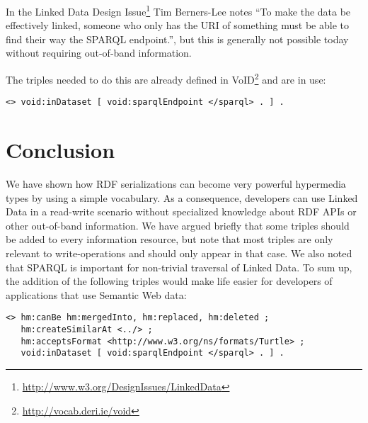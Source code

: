 \documentclass{llncs}
\begin{document}
In the Linked Data Design
Issue\footnote{\url{http://www.w3.org/DesignIssues/LinkedData}} Tim
Berners-Lee notes ``To make the data be effectively linked, someone
who only has the URI of something must be able to find their way the
SPARQL endpoint.'', but this is generally not possible today without
requiring out-of-band information.

The triples needed to do this are already defined in
VoID\footnote{\url{http://vocab.deri.ie/void}} and are in use:
\begin{verbatim}
<> void:inDataset [ void:sparqlEndpoint </sparql> . ] .
\end{verbatim}

\section{Conclusion}

We have shown how RDF serializations can become very powerful
hypermedia types by using a simple vocabulary. As a consequence,
developers can use Linked Data in a read-write scenario without
specialized knowledge about RDF APIs or other out-of-band
information. We have argued briefly that some triples should be added
to every information resource, but note that most triples are only
relevant to write-operations and should only appear in that case. We
also noted that SPARQL is important for non-trivial traversal of
Linked Data. To sum up, the addition of the following triples would
make life easier for developers of applications that use Semantic Web
data:

\begin{verbatim}
<> hm:canBe hm:mergedInto, hm:replaced, hm:deleted ;
   hm:createSimilarAt <../> ;
   hm:acceptsFormat <http://www.w3.org/ns/formats/Turtle> ;
   void:inDataset [ void:sparqlEndpoint </sparql> . ] .
\end{verbatim}


%
%

\end{document}

